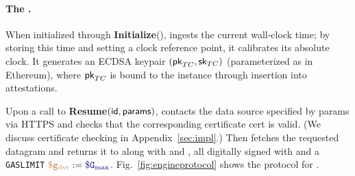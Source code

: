 \paragraph{The \encname \engine.}
When initialized through {\bf Initialize}(), \engine ingests the current wall-clock time;
by storing this time and setting a clock reference point, it calibrates its absolute clock.
It generates an ECDSA keypair $({\sf pk}_{TC},{\sf sk}_{TC})$ (parameterized as in Ethereum), where ${\sf pk}_{TC}$ is bound to the \engine instance through insertion into attestations.

Upon a call to {\bf Resume}$({\sf id}, {\sf params})$, \engine contacts the data source specified by {\sf params} via HTTPS and checks that the corresponding certificate {\sf cert} is valid.
(We discuss certificate checking in Appendix~\ref{sec:impl}.)
Then \engine fetches the requested datagram and returns it to \relay along with \dgform and \dgid, all digitally signed with \skTC and a {\tt GASLIMIT} $\gasdeliver := \constgasmax$.
Fig.~\ref{fig:engineprotocol} shows the protocol for \engine.

